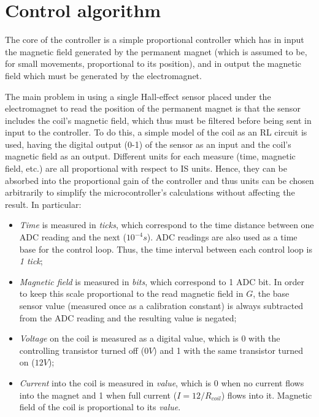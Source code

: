 \section{Control algorithm}
The core of the controller is a simple proportional controller which has in input the magnetic field generated by the permanent magnet (which is assumed to be, for small movements, proportional to its position), and in output the magnetic field which must be generated by the electromagnet.

The main problem in using a single Hall-effect sensor placed under the electromagnet to read the position of the permanent magnet is that the sensor includes the coil's magnetic field, which thus must be filtered before being sent in input to the controller. To do this, a simple model of the coil as an RL circuit is used, having the digital output (0-1) of the sensor as an input and the coil's magnetic field as an output. Different units for each measure (time, magnetic field, etc.) are all proportional with respect to IS units. Hence, they can be absorbed into the proportional gain of the controller and thus units can be chosen arbitrarily to simplify the microcontroller's calculations without affecting the result. In particular:

\begin{itemize}
  \item{\emph{Time} is measured in \emph{ticks}, which correspond to the time distance between one ADC reading and the next ($10^{-4}s$). ADC readings are also used as a time base for the control loop. Thus, the time interval between each control loop is \emph{1 tick};}
  \item{\emph{Magnetic field} is measured in \emph{bits}, which correspond to 1 ADC bit. In order to keep this scale proportional to the read magnetic field in $G$, the base sensor value (measured once as a calibration constant) is always subtracted from the ADC reading and the resulting value is negated;}
  \item{\emph{Voltage} on the coil is measured as a digital value, which is 0 with the controlling transistor turned off ($0V$) and 1 with the same transistor turned on ($12V$);}
  \item{\emph{Current} into the coil is measured in \emph{value}, which is 0 when no current flows into the magnet and 1 when full current ($I=12/R_{coil}$) flows into it. Magnetic field of the coil is proportional to its \emph{value}.}


\end{itemize}

